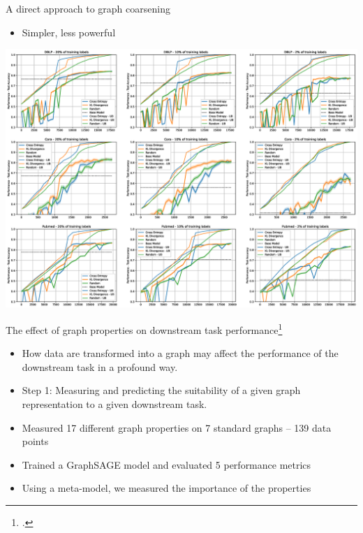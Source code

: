 \documentclass[10pt]{beamer}
\begin{document}
\begin{frame}{A direct approach to graph coarsening}
	\begin{itemize}
		\item Simpler, less powerful
	\end{itemize}

	\vspace{-25pt}

	\centering
	\includegraphics[width=\linewidth]{images/direct-graph-coarsening-results.eps}
\end{frame}

\begin{frame}{The effect of graph properties on downstream task performance\footcite{prochazka_which_2023}}
	\begin{itemize}
		\item How data are transformed into a graph may affect the performance of the downstream task in a profound way.
		\item Step 1: Measuring and predicting the suitability of a given graph representation to a given downstream task.
		\item Measured 17 different graph properties on 7 standard graphs -- 139 data points
		\item Trained a GraphSAGE model and evaluated 5 performance metrics
		\item Using a meta-model, we measured the importance of the properties
	\end{itemize}
\end{frame}
\end{document}
